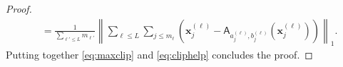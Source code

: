 \documentclass[10pt,a4paper]{amsart}
\begin{document}
\begin{proof}
\begin{align}
		&=\frac{1}{\sum_{\ell'\leq L} m_{\ell'}}\left\lVert \sum_{\ell\leq L}\sum_{j\leq m_\ell} \left(\mathbf{x}_j^{(\ell)} - \mathsf{A}_{a_j^{(\ell)},b_j^{(\ell)}}(\mathbf{x}_j^{(\ell)}) \right)\right \rVert_1. \label{eq:cliphelp}
	\end{align}
	Putting together \eqref{eq:maxclip} and \eqref{eq:cliphelp} concludes the proof.
\end{proof}
\end{document}
